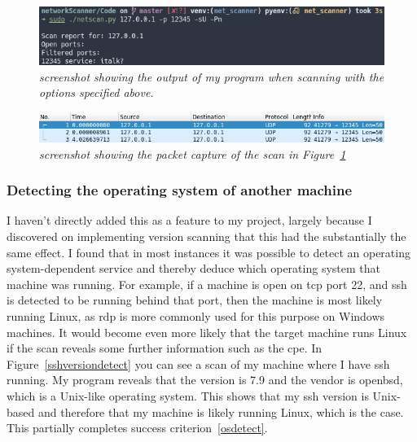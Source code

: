\documentclass[titlepage]{article}
\let\Oldsubsubsection\subsubsection{}
\renewcommand{\subsubsection}{\FloatBarrier\Oldsubsubsection}
\begin{document}
\begin{figure}[H]
  \centering
  \includegraphics[width=\textwidth]{udpfilteredoutput.png}
  \caption{\textit{%
    screenshot showing the output of my program when scanning with the
    options specified above.
}}\label{udpfilteredoutput}
\end{figure}

\begin{figure}[H]
  \centering
  \includegraphics[width=\textwidth]{udpfilteredpcap.png}
  \caption{\textit{%
    screenshot showing the packet capture of the scan in Figure~\ref{udpfilteredoutput}
}}\label{udpfilteredpcap}
\end{figure}

\subsubsection{Detecting the operating system of another machine}\label{test:osdetect}
I haven't directly added this as a feature to my project, largely because
I discovered on implementing version scanning that this had the substantially the same effect.
I found that in most instances it was possible to detect an operating system-dependent
service and thereby deduce which operating system that machine was running.
For example, if a machine is open on \gls{tcp} port 22,
and \gls{ssh} is detected to be running behind that port,
then the machine is most likely running Linux, as \gls{rdp} is more commonly used
for this purpose on Windows machines.
It would become even more likely that the target machine runs Linux
if the scan reveals some further information such as the \gls{cpe}.
In Figure~\ref{sshversiondetect} you can see a scan of my machine where I have \gls{ssh} running.
My program reveals that the version is 7.9 and the vendor is openbsd, which is a Unix-like operating system.
This shows that my \gls{ssh} version is Unix-based and therefore that my machine is likely running Linux,
which is the case.
This partially completes success criterion~\ref{osdetect}.
\end{document}
